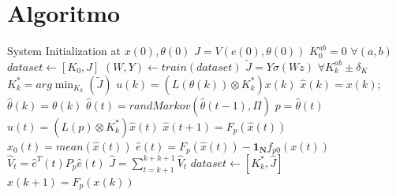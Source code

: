 
\section{Algoritmo}

\begin{algorithm} [h]
\caption{NN-based MPC pseudocode for consensus control}
\label{alg:NNMPC}
\begin{algorithmic}[1]

    \State System Initialization at $x(0), \theta(0)$
    \State $J = V(e(0),\theta(0))$
    \State $K^{ab}_0 = 0$ $\forall (a,b)$
    \State $dataset \gets [K_0,J]$
     
        \State $(W,Y) \gets train(dataset)$
        \State $\tilde{J} = Y\sigma(Wz)$ $\forall K^{ab}_k\pm \delta_K
        $
        \State $K_k^{\ast} = arg \min_{K_k}(\tilde{J})$
        \State $u(k) =  \left( L(\theta(k)) \otimes K_k^{\ast} \right) x(k)$
        \State $\hat{x}(k) = x(k)$; $\hat{\theta}(k) = \theta(k)$
         
                \State $\hat{\theta}(t) = randMarkov(\hat{\theta}(t-1),\Pi)$
                \State $p = \hat{\theta}(t)$
                \State $\hat{u}(t) = \left( L(p) \otimes K_k^{\ast} \right) \hat{x}(t)$
                \State $\hat{x}(t+1) = F_p(\hat{x}(t))$
                \State $x_0(t) = mean(\hat{x}(t))$
                \State $\hat{e}(t) = F_p(\hat{x}(t)) - \boldsymbol{1_N} f_{p0}(x(t)) $
                \State $\hat{V}_t = \hat{e}^T(t)P_{p}\hat{e}(t)$
                \EndFor
        \State $\hat{J} = \sum_{t = k+1}^{k+h+1} \hat{V}_t$
        \State $dataset \gets [K^{\ast}_k,\hat{J}]$
        \State $x(k+1) = F_p(x(k))$
    \EndFor
    

\end{algorithmic}
\end{algorithm}

